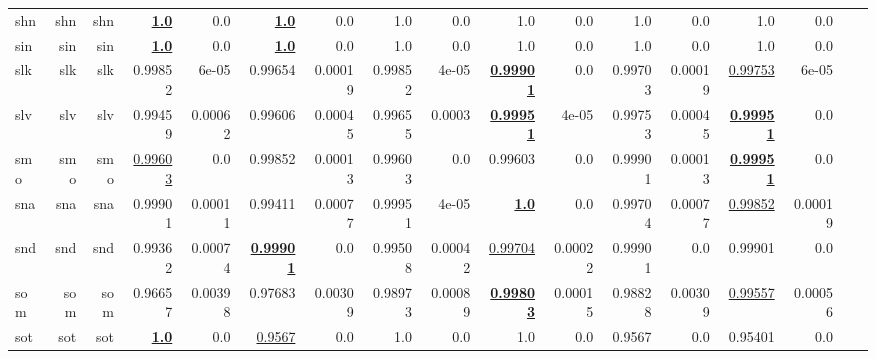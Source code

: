 \documentclass[11pt]{article}
\begin{document}
\begin{table*}[h]
{\begin{tabular}{lrrrrrrrrrrrrrrrr}
shn         & shn         & shn         & \textbf{\underline{1.0}}         & 0.0         & \textbf{\underline{1.0}}         & 0.0         & 1.0         & 0.0         & 1.0         & 0.0         & 1.0         & 0.0         & 1.0         & 0.0         \\
sin         & sin         & sin         & \textbf{\underline{1.0}}         & 0.0         & \textbf{\underline{1.0}}         & 0.0         & 1.0         & 0.0         & 1.0         & 0.0         & 1.0         & 0.0         & 1.0         & 0.0         \\
slk         & slk         & slk         & 0.99852         & 6e-05         & 0.99654         & 0.00019         & 0.99852         & 4e-05         & \textbf{\underline{0.99901}}         & 0.0         & 0.99703         & 0.00019         & \underline{0.99753}         & 6e-05         \\
slv         & slv         & slv         & 0.99459         & 0.00062         & 0.99606         & 0.00045         & 0.99655         & 0.0003         & \textbf{\underline{0.99951}}         & 4e-05         & 0.99753         & 0.00045         & \textbf{\underline{0.99951}}         & 0.0         \\
smo         & smo         & smo         & \underline{0.99603}         & 0.0         & 0.99852         & 0.00013         & 0.99603         & 0.0         & 0.99603         & 0.0         & 0.99901         & 0.00013         & \textbf{\underline{0.99951}}         & 0.0         \\
sna         & sna         & sna         & 0.99901         & 0.00011         & 0.99411         & 0.00077         & 0.99951         & 4e-05         & \textbf{\underline{1.0}}         & 0.0         & 0.99704         & 0.00077         & \underline{0.99852}         & 0.00019         \\
snd         & snd         & snd         & 0.99362         & 0.00074         & \textbf{\underline{0.99901}}         & 0.0         & 0.99508         & 0.00042         & \underline{0.99704}         & 0.00022         & 0.99901         & 0.0         & 0.99901         & 0.0         \\
som         & som         & som         & 0.96657         & 0.00398         & 0.97683         & 0.00309         & 0.98973         & 0.00089         & \textbf{\underline{0.99803}}         & 0.00015         & 0.98828         & 0.00309         & \underline{0.99557}         & 0.00056         \\
sot         & sot         & sot         & \textbf{\underline{1.0}}         & 0.0         & \underline{0.9567}         & 0.0         & 1.0         & 0.0         & 1.0         & 0.0         & 0.9567         & 0.0         & 0.95401         & 0.0         \\

\end{tabular}}
\end{table*}
\end{document}
